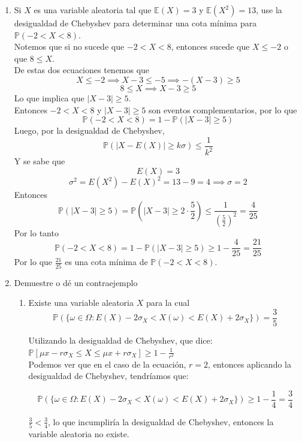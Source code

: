 \documentclass[12pt,a4paper]{report}
\begin{document}
\begin{enumerate}
		\item{
			Si $X$ es una variable aleatoria tal que $\mathbb{E}(X) = 3$ y
			$\mathbb{E}(X^2) = 13$, use la desigualdad de Chebyshev para
			determinar una cota mínima para $\mathbb{P}(-2 < X < 8)$.\\
			Notemos que si no sucede que $-2 < X < 8$, entonces  sucede que
					$X \leq -2$ o que $8 \leq X$.\\
					De estas dos ecuaciones tenemos que
					\[X \leq -2 \implies X - 3 \leq -5 \implies -(X - 3) \geq 5\]
					\[ 8 \leq X \implies X - 3 \geq 5\]
					Lo que implica que $|X-3| \geq 5$.\\
					Entonces $-2 < X < 8$ y $|X-3| \geq 5$ son eventos
					complementarios, por lo que
					\[\mathbb{P}(-2 < X < 8) = 1 - \mathbb{P}(|X-3| \geq 5)\]
					Luego, por la desigualdad de Chebyshev,
					\[\mathbb{P}(|X-E(X)| \geq k\sigma) \leq \frac{1}{k^2}\]
					Y se sabe que
					\[E(X) = 3\]
					\[\sigma ^2 = E(X^2) - E(X)^2 = 13 - 9 = 4 \implies \sigma = 2\]
					Entonces
					\[\mathbb{P}(|X-3| \geq 5) = \mathbb{P}(|X-3| \geq 2\cdot \frac{5}{2})
					 \leq \frac{1}{(\frac{5}{2})^2} = \frac{4}{25}\]
					Por lo tanto
					\[\mathbb{P}(-2 < X < 8) = 1 - \mathbb{P}(|X-3| \geq 5)
					\geq 1 - \frac{4}{25} = \frac{21}{25}\]
					Por lo que $\frac{21}{25}$ es una cota mínima de
					$\mathbb{P}(-2 < X < 8)$.
		}

		\item{
			Demuestre o dé un contraejemplo
			\begin{enumerate}
				\item {
					Existe una variable aleatoria $X$ para la cual
					\[\mathbb{P}(\{\omega \in \Omega : E(X) - 2\sigma_X <
					X(\omega) <
					E(X) + 2\sigma_X\}) = \frac{3}{5}\]
					
					
					Utilizando la desigualdad de Chebyshev, que dice:\\
					$\mathbb{P}[ \mu x - r\sigma_X \leq X \leq \mu x + r\sigma_X] \geq 1 - \frac{1}{r^2}$\\
					
				Podemos ver que en el caso de la ecuación, $r = 2$, entonces aplicando la desigualdad de Chebyshev, tendríamos que:
				
				\[\mathbb{P}(\{\omega \in \Omega : E(X) - 2\sigma_X <
					X(\omega) <
					E(X) + 2\sigma_X\}) \geq 1 - \frac{1}{4} = \frac{3}{4}\]
					
					$\frac{3}{5} < \frac{3}{4}$, lo que incumpliría la desigualdad de Chebyshev, entonces la variable aleatoria no existe.\\

}
\end{enumerate}}
\end{enumerate}
\end{document}
